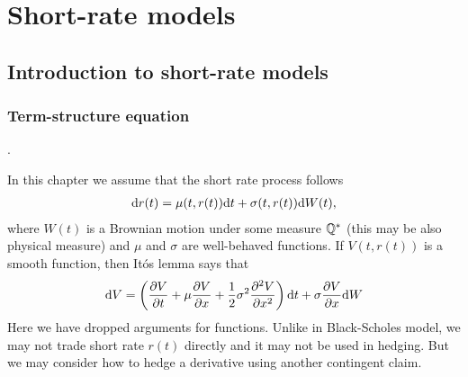 \chapter{Short-rate models}
\label{chap:shortrate}


\section{Introduction to short-rate models}

\subsection{Term-structure equation}

 \textcite[pp. 319--324]{bjork2004arbitrage}.

In this chapter we assume that the short rate process follows
\begin{align}
\label{short-ratedynamicsundersomemeasure}
\mathrm{d} r(t) = \mu(t,r(t)) \mathrm{d} t + \sigma(t,r(t)) \mathrm{d} W(t) ,
\end{align}
where $W(t)$ is a Brownian motion under some measure $\mathbb{Q}^*$ (this may be also physical measure) and $\mu$ and $\sigma$ are well-behaved functions. If $V(t,r(t))$ is a smooth function, then It\'{o}s lemma says that
\begin{align}
\mathrm{d} V = \left( \frac{\partial V}{\partial t} + \mu \frac{\partial V}{\partial x} +\frac{1}{2} \sigma^2 \frac{\partial^2 V}{\partial x^2} \right) \mathrm{d} t + \sigma \frac{\partial V}{\partial x} \mathrm{d} W
\end{align}
Here we have dropped arguments for functions. Unlike in Black-Scholes model, we may not trade short rate $r(t)$ directly and it may not be used in hedging. But we may consider how to hedge a derivative using another contingent claim.

